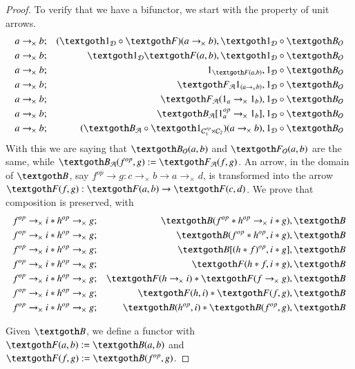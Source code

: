\documentclass [12pt]{book}
\begin{document}
\begin{proof}To verify that we have a bifunctor, we start with the property of unit arrows.\begin{eqnarray}\nonumber a\rightarrow_\times b&;&(\textgoth1_\mathcal D\circ\textgoth F)(a\rightarrow_\times b),\textgoth1_{\mathcal D}\circ\textgoth B_{\mathcal O}\\\nonumber a\rightarrow_\times b&;&\textgoth1_\mathcal D\textgoth F(a,b),\textgoth1_{\mathcal D}\circ\textgoth B_{\mathcal O}\\\nonumber a\rightarrow_\times b&;&1_{\textgoth F(a,b)},1_{\mathcal D}\circ\textgoth B_{\mathcal O}\\\nonumber a\rightarrow_\times b&;&\textgoth F_\mathcal A1_{(a\rightarrow_\times b)},1_{\mathcal D}\circ\textgoth B_{\mathcal O}\\\nonumber a\rightarrow_\times b&;&\textgoth F_\mathcal A(1_a\rightarrow_\times 1_b),1_{\mathcal D}\circ\textgoth B_{\mathcal O}\\\nonumber a\rightarrow_\times b&;&\textgoth B_\mathcal A[1_a^{op}\rightarrow_\times 1_b],1_{\mathcal D}\circ\textgoth B_{\mathcal O}\\\nonumber a\rightarrow_\times b&;&(\textgoth B_\mathcal A\circ\textgoth1_{\mathcal C_1^{op}\times\mathcal C_2})(a\rightarrow_\times b),1_{\mathcal D}\circ\textgoth B_{\mathcal O}\end{eqnarray}With this we are saying that $\textgoth B_\mathcal O(a,b)$ and $\textgoth F_\mathcal O(a,b)$ are the same, while $\textgoth B_\mathcal A(f^{op},g):=\textgoth F_\mathcal A(f,g)$. An arrow, in the domain of $\textgoth B$, say $f^{op}\rightarrow g:c\rightarrow_\times b\longrightarrow a\rightarrow_\times d$, is transformed into the arrow $\textgoth F(f,g):\textgoth F(a,b)\rightarrow\textgoth F(c,d)$. We prove that composition is preserved, with\begin{eqnarray}\nonumber f^{op}\rightarrow_\times i*h^{op}\rightarrow_\times g&;&\textgoth B(f^{op}*h^{op}\rightarrow_\times i*g),\textgoth B\\\nonumber f^{op}\rightarrow_\times i*h^{op}\rightarrow_\times g&;&\textgoth B(f^{op}*h^{op},i*g),\textgoth B\\\nonumber f^{op}\rightarrow_\times i*h^{op}\rightarrow_\times g&;&\textgoth B[(h*f)^{op},i*g],\textgoth B\\\nonumber f^{op}\rightarrow_\times i*h^{op}\rightarrow_\times g&;&\textgoth F(h*f,i*g),\textgoth B\\\nonumber f^{op}\rightarrow_\times i*h^{op}\rightarrow_\times g&;&\textgoth F(h\rightarrow_\times i)*\textgoth F(f\rightarrow_\times g),\textgoth B\\\nonumber f^{op}\rightarrow_\times i*h^{op}\rightarrow_\times g&;&\textgoth F(h,i)*\textgoth F(f,g),\textgoth B\\\nonumber f^{op}\rightarrow_\times i*h^{op}\rightarrow_\times g&;&\textgoth B(h^{op},i)*\textgoth B(f^{op},g),\textgoth B\end{eqnarray}

Given $\textgoth B$, we define a functor with $\textgoth F(a,b):=\textgoth B(a,b)$ and $\textgoth F(f,g):=\textgoth B(f^{op},g)$.\end{proof}
\end{document}
